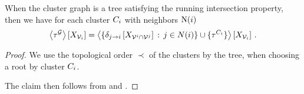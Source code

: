 \begin{theorem}
	When the cluster graph is a tree satisfying the running intersection property, then we have for each cluster $C_{i}$ with neighbors $\mathrm{N}(i)$
	\begin{align}
		\left\langle \tau^{\mathcal{G}}\right\rangle \left[ X_{\mathcal{V}_i} \right] =
		\left\langle \{ \delta_{j \rightarrow i}\left[X_{\mathcal{V}^{i}\cap\mathcal{V}^{j}}\right]  \,:\, j \in N(i) \} \cup \{\tau^{C_{i}}\}\right\rangle \left[ X_{\mathcal{V}_i} \right] \, .
	\end{align}
\end{theorem}
\begin{proof}
	We use the topological order $\prec$ of the clusters by the tree, when choosing a root by cluster $C_{i}$.

	The claim then follows from  and .
%

\end{proof}


